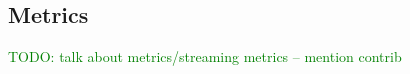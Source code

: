 \subsection{Metrics}

\textcolor{green}{TODO: talk about metrics/streaming metrics -- mention contrib}